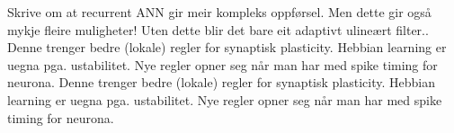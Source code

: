 Skrive om at recurrent ANN gir meir kompleks oppførsel. Men dette gir også mykje fleire muligheter! Uten dette blir det bare eit adaptivt ulineært filter..
Denne trenger bedre (lokale) regler for synaptisk plasticity. Hebbian learning er uegna pga. ustabilitet. Nye regler opner seg når man har med spike timing for neurona. 
Denne trenger bedre (lokale) regler for synaptisk plasticity. Hebbian learning er uegna pga. ustabilitet. Nye regler opner seg når man har med spike timing for neurona. 


